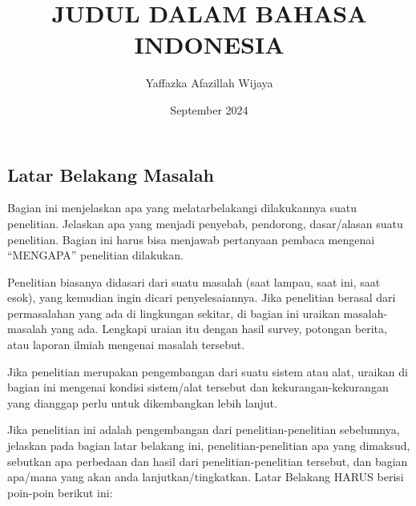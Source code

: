 \documentclass{final_project}
\title{JUDUL DALAM BAHASA INDONESIA}
\author{Yaffazka Afazillah Wijaya}
\date{September 2024}
\begin{document}

%

\addalllist{}


\subsection{Latar Belakang Masalah}

Bagian ini menjelaskan apa yang melatarbelakangi dilakukannya suatu 
penelitian. 
Jelaskan apa yang menjadi penyebab, pendorong, dasar/alasan suatu penelitian. 
Bagian ini harus bisa menjawab pertanyaan pembaca mengenai “MENGAPA” penelitian dilakukan.

Penelitian biasanya didasari dari suatu masalah (saat lampau, saat ini, saat esok), yang kemudian ingin dicari penyelesaiannya. Jika penelitian berasal dari permasalahan yang ada di lingkungan sekitar, di bagian ini uraikan masalah-masalah yang ada. Lengkapi uraian itu dengan hasil survey, potongan berita, atau laporan ilmiah mengenai masalah tersebut.

Jika penelitian merupakan pengembangan dari suatu sistem atau alat, uraikan di bagian ini mengenai kondisi sistem/alat tersebut dan kekurangan-kekurangan yang dianggap perlu untuk dikembangkan lebih lanjut.

Jika penelitian ini adalah pengembangan dari penelitian-penelitian sebelumnya, jelaskan pada bagian latar belakang ini, penelitian-penelitian apa yang dimaksud, sebutkan apa perbedaan dan hasil dari penelitian-penelitian tersebut, dan bagian apa/mana yang akan anda lanjutkan/tingkatkan. Latar Belakang HARUS berisi poin-poin berikut ini:
\end{document}
